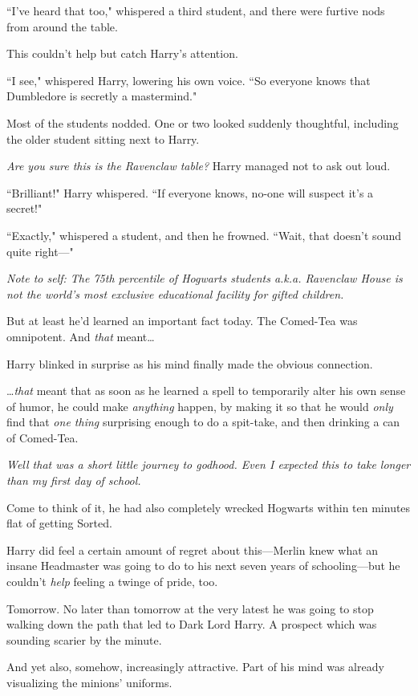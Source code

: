 ``I've heard that too," whispered a third student, and there were furtive nods from around the table.

This couldn't help but catch Harry's attention.

``I see," whispered Harry, lowering his own voice. ``So everyone knows that Dumbledore is secretly a mastermind."

Most of the students nodded. One or two looked suddenly thoughtful, including the older student sitting next to Harry.

\emph{Are you sure this is the Ravenclaw table?} Harry managed not to ask out loud.

``Brilliant!" Harry whispered. ``If everyone knows, no-one will suspect it's a secret!"

``Exactly," whispered a student, and then he frowned. ``Wait, that doesn't sound quite right—"

\emph{Note to self: The 75th percentile of Hogwarts students a.k.a. Ravenclaw House is not the world's most exclusive educational facility for gifted children.}

But at least he'd learned an important fact today. The Comed-Tea was omnipotent. And \emph{that} meant{\ldots}

Harry blinked in surprise as his mind finally made the obvious connection.

{\ldots}\emph{that} meant that as soon as he learned a spell to temporarily alter his own sense of humor, he could make \emph{anything} happen, by making it so that he would \emph{only} find that \emph{one thing} surprising enough to do a spit-take, and then drinking a can of Comed-Tea.

\emph{Well that was a short little journey to godhood. Even I expected this to take longer than my first day of school.}

Come to think of it, he had also completely wrecked Hogwarts within ten minutes flat of getting Sorted.

Harry did feel a certain amount of regret about this—Merlin knew what an insane Headmaster was going to do to his next seven years of schooling—but he couldn't \emph{help} feeling a twinge of pride, too.

Tomorrow. No later than tomorrow at the very latest he was going to stop walking down the path that led to Dark Lord Harry. A prospect which was sounding scarier by the minute.

And yet also, somehow, increasingly attractive. Part of his mind was already visualizing the minions' uniforms.

